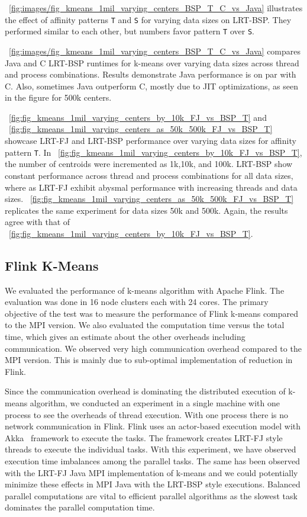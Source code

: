 \documentclass[10pt, conference, compsocconf]{IEEEtran}
\begin{document}
\figurename~\ref{fig:images/fig_kmeans_1mil_varying_centers_BSP_T_C_vs_Java} illustrates the effect of affinity patterns \texttt{T} and \texttt{S} for varying data sizes on \ac{LRT-BSP}. They performed similar to each other, but numbers favor pattern \texttt{T} over \texttt{S}.

\figurename~\ref{fig:images/fig_kmeans_1mil_varying_centers_BSP_T_C_vs_Java} compares Java and C \ac{LRT-BSP} runtimes for k-means over varying data sizes across thread and process combinations. Results demonstrate Java performance is on par with C. Also, sometimes Java outperform C, mostly due to \ac{JIT} optimizations, as seen in the figure for 500k centers. 

\figurename~\ref{fig:fig_kmeans_1mil_varying_centers_by_10k_FJ_vs_BSP_T} and \figurename~\ref{fig:fig_kmeans_1mil_varying_centers_as_50k_500k_FJ_vs_BSP_T} showcase \ac{LRT-FJ} and \ac{LRT-BSP} performance over varying data sizes for affinity pattern \texttt{T}. In \figurename~\ref{fig:fig_kmeans_1mil_varying_centers_by_10k_FJ_vs_BSP_T}, the number of centroids were incremented as 1k,10k, and 100k. \ac{LRT-BSP} show constant performance across thread and process combinations for all data sizes, where as \ac{LRT-FJ} exhibit abysmal performance with increasing threads and data sizes. \figurename~\ref{fig:fig_kmeans_1mil_varying_centers_as_50k_500k_FJ_vs_BSP_T} replicates the same experiment for data sizes 50k and 500k. Again, the results agree with that of \figurename~\ref{fig:fig_kmeans_1mil_varying_centers_by_10k_FJ_vs_BSP_T}.

\subsection{Flink K-Means}
We evaluated the performance of k-means algorithm with Apache Flink. The evaluation was done in 16 node clusters each with 24 cores. The primary objective of the test was to measure the performance of Flink k-means compared to the MPI version. We also evaluated the computation time versus the total time, which gives an estimate about the other overheads including communication. We observed very high communication overhead compared to the MPI version. This is mainly due to sub-optimal implementation of reduction in Flink.

Since the communication overhead is dominating the distributed execution of k-means algorithm, we conducted an experiment in a single machine with one process to see the overheads of thread execution. With one process there is no network communication in Flink. Flink uses an actor-based execution model with Akka~\cite{gupta2012akka} framework to execute the tasks. The framework creates \ac{LRT-FJ} style threads to execute the individual tasks. With this experiment, we have observed execution time imbalances among the parallel tasks. The same has been observed with the \ac{LRT-FJ} Java MPI implementation of k-means and we could potentially minimize these effects in MPI Java with the \ac{LRT-BSP} style executions. Balanced parallel computations are vital to efficient parallel algorithms as the slowest task dominates the parallel computation time. 
\end{document}
